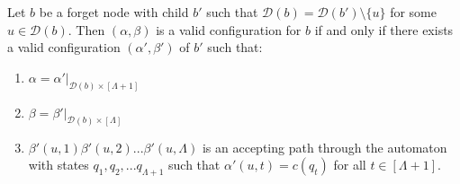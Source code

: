 \documentclass[runningheads]{llncs}
\begin{document}
\begin{lemmarep} \label{lem:forget node}
    Let $b$ be a forget node with child $b'$ such that $\mathcal{D}(b)=\mathcal{D}(b')\setminus \{u\}$ for some $u \in \mathcal{D}(b)$. Then $(\alpha,\beta)$ is a valid configuration for $b$ if and only if there exists a valid configuration $(\alpha',\beta')$ of $b'$ such that:
    \begin{enumerate}
        \item $\alpha=\alpha'|_{\mathcal{D}(b) \times [\Lambda+1]}$
        \item $\beta=\beta'|_{\mathcal{D}(b) \times [\Lambda]}$
        \item $\beta'(u,1)\beta'(u,2)...\beta'(u,\Lambda)$ is an accepting path through the automaton with states $q_1,q_2,...q_{\Lambda+1}$ such that $\alpha'(u,t)=c(q_t)$ for all $t \in [\Lambda+1]$.
    \end{enumerate}
\end{lemmarep}
\end{document}

